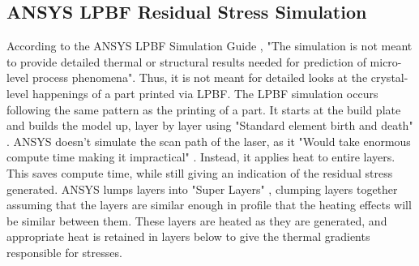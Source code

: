 \subsection{ANSYS LPBF Residual Stress Simulation}
According to the ANSYS LPBF Simulation Guide \cite{ansys_lpbf_simulation_guide_2025r1}, "The simulation is not meant to provide detailed thermal or structural results needed for prediction of micro-level process phenomena".  Thus, it is not meant for detailed looks at the crystal-level happenings of a part printed via LPBF.  
\newline \indent The LPBF simulation occurs following the same pattern as the printing of a part.  It starts at the build plate and builds the model up, layer by layer using "Standard element birth and death" \cite{ansys_lpbf_simulation_guide_2025r1}.  ANSYS doesn't simulate the scan path of the laser, as it "Would take enormous compute time making it impractical" \cite{ansys_lpbf_simulation_guide_2025r1}.  Instead, it applies heat to entire layers.  This saves compute time, while still giving an indication of the residual stress generated.  
\indent ANSYS lumps layers into "Super Layers" \cite{ansys_lpbf_simulation_guide_2025r1}, clumping layers together assuming that the layers are similar enough in profile that the heating effects will be similar between them.  These layers are heated as they are generated, and appropriate heat is retained in layers below to give the thermal gradients responsible for stresses.

